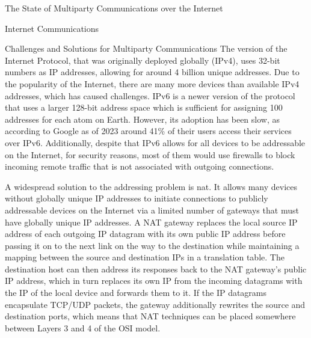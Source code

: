 \begin{frame}[fragile]{The State of Multiparty Communications over the
Internet}
\begin{block}{Internet Communications}
\begin{block}{Challenges and Solutions for Multiparty Communications}
\protect\hypertarget{challenges-and-solutions-for-multiparty-communications}{}
The version of the Internet Protocol, that was originally deployed
globally (IPv4), uses 32-bit numbers as IP addresses, allowing for
around 4 billion unique addresses. Due to the popularity of the
Internet, there are many more devices than available IPv4 addresses,
which has caused challenges. IPv6 is a newer version of the protocol
that uses a larger 128-bit address space which is sufficient for
assigning 100 addresses for each atom on Earth. However, its adoption
has been slow, as according to Google\autocite{IPv6Google} as of 2023
around 41\% of their users access their services over IPv6.
Additionally, despite that IPv6 allows for all devices to be addressable
on the Internet, for security reasons, most of them would use firewalls
to block incoming remote traffic that is not associated with outgoing
connections.

A widespread solution to the addressing problem is \gls{nat}. It allows
many devices without globally unique IP addresses to initiate
connections to publicly addressable devices on the Internet via a
limited number of gateways that must have globally unique IP addresses.
A NAT gateway replaces the local source IP address of each outgoing IP
datagram with its own public IP address before passing it on to the next
link on the way to the destination while maintaining a mapping between
the source and destination IPs in a translation table. The destination
host can then address its responses back to the NAT gateway's public IP
address, which in turn replaces its own IP from the incoming datagrams
with the IP of the local device and forwards them to it. If the IP
datagrams encapsulate TCP/UDP packets, the gateway additionally rewrites
the source and destination ports, which means that NAT techniques can be
placed somewhere between Layers 3 and 4 of the OSI model.


\end{block}
\end{block}
\end{frame}
